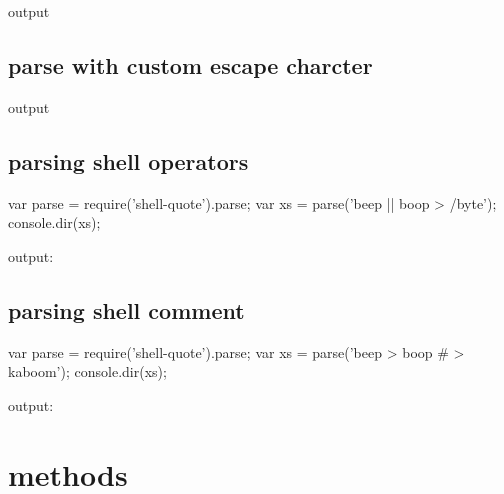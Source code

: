 output


\begin{DoxyCode}
[ 'beep', '--boop=/home/robot' ]
\end{DoxyCode}


\subsection*{parse with custom escape charcter}




output


\begin{DoxyCode}
[ 'beep', '--boop=/home/robot' ]
\end{DoxyCode}


\subsection*{parsing shell operators}


\begin{DoxyCode}
var parse = require('shell-quote').parse;
var xs = parse('beep || boop > /byte');
console.dir(xs);
\end{DoxyCode}


output\+:


\begin{DoxyCode}
\end{DoxyCode}


\subsection*{parsing shell comment}


\begin{DoxyCode}
var parse = require('shell-quote').parse;
var xs = parse('beep > boop # > kaboom');
console.dir(xs);
\end{DoxyCode}


output\+:


\begin{DoxyCode}
\end{DoxyCode}


\section*{methods}


